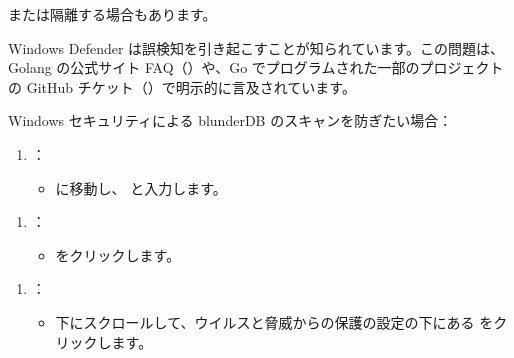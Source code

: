 \documentclass[letterpaper,10pt,dvipdfmx]{sphinxmanual}
\begin{document}
\sphinxAtStartPar
または隔離する場合もあります。

\sphinxAtStartPar
Windows Defender は誤検知を引き起こすことが知られています。この問題は、Golang の公式サイト FAQ（）や、Go でプログラムされた一部のプロジェクトの GitHub チケット（）で明示的に言及されています。

\sphinxAtStartPar
Windows セキュリティによる blunderDB のスキャンを防ぎたい場合：
\begin{enumerate}
%
\item {} 
\sphinxAtStartPar
{}：
\begin{itemize}
\item {} 
\sphinxAtStartPar
{} に移動し、 と入力します。

\end{itemize}

\end{enumerate}

\begin{figure}[htbp]
\centering

\noindent{}
\end{figure}
\begin{enumerate}
%
\setcounter{enumi}{1}
\item {} 
\sphinxAtStartPar
{}：
\begin{itemize}
\item {} 
\sphinxAtStartPar
{} をクリックします。

\end{itemize}

\end{enumerate}

\begin{figure}[htbp]
\centering

\noindent{}
\end{figure}
\begin{enumerate}
%
\setcounter{enumi}{2}
\item {} 
\sphinxAtStartPar
{}：
\begin{itemize}
\item {} 
\sphinxAtStartPar
下にスクロールして、ウイルスと脅威からの保護の設定の下にある  をクリックします。

\end{itemize}

\end{enumerate}
\end{document}
